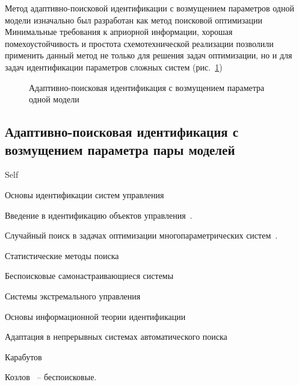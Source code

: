 Метод адаптивно-поисковой идентификации с возмущением параметров одной модели
изначально был разработан как метод поисковой оптимизации
\cite{mich_92}
Минимальные требования к априорной информации, хорошая помехоустойчивость и
простота схемотехнической реализации позволили применить данный метод не только
для решения задач оптимизации, но и для задач идентификации параметров сложных
систем
(рис.~\ref{atu:f:apid1})

\begin{figure}[htb!]
\begin{center}

\end{center}
\caption{Адаптивно-поисковая идентификация с возмущением параметра одной модели}
\label{atu:f:apid1}
\end{figure}



\subsection{Адаптивно-поисковая идентификация с возмущением параметра пары моделей} %
 Self

Основы идентификации систем управления~\cite{eykhoff_id_base,eykhoff_modern_id,gropp_methods_id,deith_method_id_ds,lung_id_sys,seidg_id_su,leondes_modern_tu,nelles_nlsys_id}

Введение в идентификацию объектов управления~\cite{rastr_intro,rastr_adop_complex_sys}.

Случайный поиск в задачах оптимизации многопараметрических систем~\cite{rastr_rand_search,rastr_rand_search_adopt}.

Статистические методы поиска~\cite{rastr_stat_meth_search}

Беспоисковые самонастраивающиеся системы~\cite{kozlov_nosearch_sns}

Системы экстремального управления~\cite{rastr_seu,kras_dyn_nsn}

Основы информационной теории идентификации~\cite{info_cipkin,straton_inf,karabut}

Адаптация в непрерывных системах автоматического поиска~\cite{adopt_cont_sys}

Карабутов~\cite{karabutov_adapt_id_sys,saliga_id_ctl_black}

Козлов~\cite{kozlov_nosearch_sns} -- беспоисковые.

